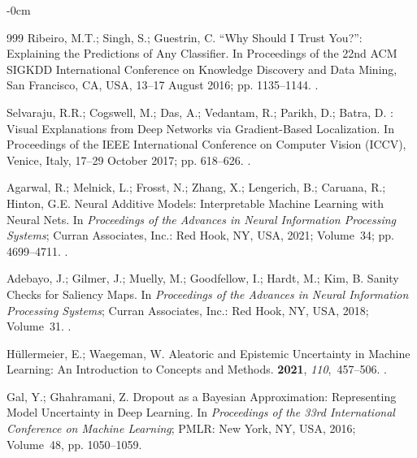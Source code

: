 \documentclass[land,review,accept,pdftex,oneauthor]{Definitions/mdpi}
\begin{document}
\begin{adjustwidth}{-\extralength}{0cm}
\begin{thebibliography}{999}
Ribeiro, M.T.; Singh, S.; Guestrin, C.
\newblock ``Why Should {I} Trust You?'': Explaining the Predictions of Any
  Classifier.
\newblock  In Proceedings of the 22nd ACM SIGKDD International
  Conference on Knowledge Discovery and Data Mining,  San Francisco, CA, USA, 13--17 August  2016; pp. 1135--1144.
.

Selvaraju, R.R.; Cogswell, M.; Das, A.; Vedantam, R.; Parikh, D.; Batra, D.
: Visual Explanations from Deep Networks via Gradient-Based
  Localization.
\newblock In Proceedings of the IEEE International
  Conference on Computer Vision (ICCV),  Venice, Italy, 17--29 October 2017; pp. 618--626.
.

Agarwal, R.; Melnick, L.; Frosst, N.; Zhang, X.; Lengerich, B.; Caruana, R.;
  Hinton, G.E.
\newblock Neural Additive Models: Interpretable Machine Learning with Neural
  Nets.
\newblock In \emph{Proceedings of the Advances in Neural Information Processing
  Systems}; Curran Associates, Inc.: Red Hook, NY, USA,  2021; Volume~34; pp. 4699--4711.
.

Adebayo, J.; Gilmer, J.; Muelly, M.; Goodfellow, I.; Hardt, M.; Kim, B.
\newblock Sanity Checks for Saliency Maps.
\newblock In \emph{Proceedings of the Advances in Neural Information Processing
  Systems}; Curran Associates, Inc.: Red Hook, NY, USA,   2018; Volume~31.
.

H{\"u}llermeier, E.; Waegeman, W.
\newblock Aleatoric and Epistemic Uncertainty in Machine Learning: An
  Introduction to Concepts and Methods.
 {\bf 2021}, {\em 110},~457--506.
.

Gal, Y.; Ghahramani, Z.
\newblock Dropout as a {Bayesian} Approximation: Representing Model Uncertainty
  in Deep Learning.
\newblock In \emph{Proceedings of the 33rd International
  Conference on Machine Learning}; PMLR: New York, NY, USA,  2016; Volume~48, pp. 1050--1059.


\end{thebibliography}
\end{adjustwidth}
\end{document}

